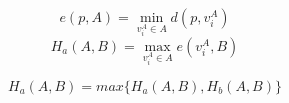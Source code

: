 \begin{equation}
e(p, A) = \min_{v^A_i\in A}{d(p, v^A_i)}
\end{equation}
\begin{equation}
H_a(A,B) = \max_{v^A_i\in A}{e(v^A_i, B)}
\end{equation}

\begin{equation}
H_a(A,B) = max\{ H_a(A,B), H_b(A,B) \}
\end{equation}